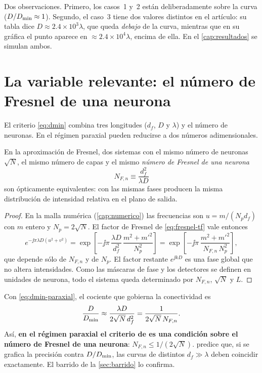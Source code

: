 \noindent Dos observaciones. Primero, los casos~1 y~2 están deliberadamente sobre la curva
($D/D_{\min}\approx1$). Segundo, el caso~3 tiene dos valores distintos en el artículo: su
tabla dice $D\approx2.4\times10^3\lambda$, que queda \emph{debajo} de la curva, mientras que
en su gráfica el punto aparece en $\approx2.4\times10^4\lambda$, encima de ella. En el
\cref{cap:resultados} se simulan ambos.

\section{La variable relevante: el número de Fresnel de una neurona}\label{sec:fresnel-neurona}

El criterio \eqref{eq:dmin} combina tres longitudes ($d_f$, $D$ y $\lambda$) y el número de
neuronas. En el régimen paraxial pueden reducirse a dos números adimensionales.

\begin{proposicion}\label{prop:fresnel}
En la aproximación de Fresnel, dos sistemas con el mismo número de neuronas $\sqrt N$, el
mismo número de capas y el mismo \emph{número de Fresnel de una neurona}
\begin{equation}
  N_{F,n}\equiv\frac{d_f^2}{\lambda D}
  \label{eq:nf-neurona}
\end{equation}
son ópticamente equivalentes: con las mismas fases producen la misma distribución de
intensidad relativa en el plano de salida.
\end{proposicion}

\begin{proof}
En la malla numérica (\cref{cap:numerico}) las frecuencias son $u=m/(N_pd_f)$ con $m$ entero
y $N_p=2\sqrt N$. El factor de Fresnel de \eqref{eq:fresnel-tf} vale entonces
\[
  e^{-\jj\pi\lambda D(u^2+v^2)}
  =\exp\!\left[-\jj\pi\,\frac{\lambda D}{d_f^2}\,\frac{m^2+m'^2}{N_p^2}\right]
  =\exp\!\left[-\jj\pi\,\frac{m^2+m'^2}{N_{F,n}\,N_p^2}\right],
\]
que depende sólo de $N_{F,n}$ y de $N_p$. El factor restante $e^{\jj kD}$ es una fase global
que no altera intensidades. Como las máscaras de fase y los detectores se definen en
unidades de neurona, todo el sistema queda determinado por $N_{F,n}$, $\sqrt N$ y $L$.
\end{proof}

Con \eqref{eq:dmin-paraxial}, el cociente que gobierna la conectividad es
\begin{equation}
  \frac{D}{D_{\min}}\approx\frac{\lambda D}{2\sqrt N\,d_f^2}=\frac{1}{2\sqrt N\,N_{F,n}} .
  \label{eq:ratio-nf}
\end{equation}
Así, \textbf{en el régimen paraxial el criterio de \textcite{chen2021} es una condición
sobre el número de Fresnel de una neurona}: $N_{F,n}\le 1/(2\sqrt N)$. 
predice que, si se grafica la precisión contra $D/D_{\min}$, las curvas de distintos $d_f\gg\lambda$ deben
coincidir exactamente. El barrido de la \cref{sec:barrido} lo confirma.

